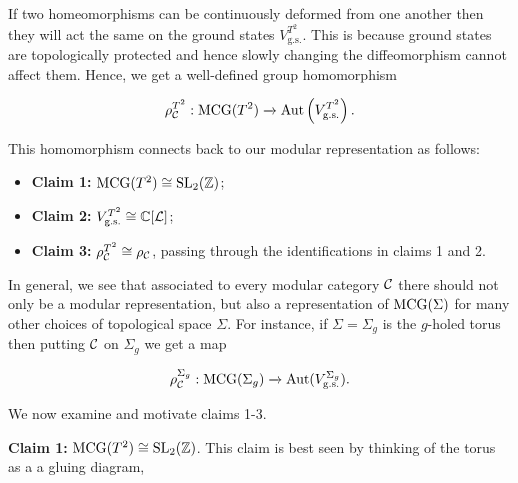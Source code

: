 If two homeomorphisms can be continuously deformed from one another then they will act the same on the ground states $V_{\text{g.s.}}^{T^2}$. This is because ground states are topologically protected and hence slowly changing the diffeomorphism cannot affect them. Hence, we get a well-defined group homomorphism

$$\rho_{{\mathcal C}}^{T^2}:\operatorname{MCG}(T^2)\xrightarrow{}\operatorname{Aut}\left(V_{\text{g.s.}}^{T^2}\right).$$

This homomorphism connects back to our modular representation as follows:

\begin{itemize}
\item \textbf{Claim 1:} $\operatorname{MCG}(T^2)\cong \operatorname{SL}_2({\mathbb Z})$;

\item \textbf{Claim 2:} $V_{\text{g.s.}}^{T^2}\cong {\mathbb C}[{\mathcal L}]$;

\item \textbf{Claim 3:} $\rho_{{\mathcal C}}^{T^2}\cong \rho_{{\mathcal C}}$, passing through the identifications in claims 1 and 2.
\end{itemize}

In general, we see that associated to every modular category ${\mathcal C}$ there should not only be a modular representation, but also a representation of $\operatorname{MCG}(\Sigma)$ for many other choices of topological space $\Sigma$. For instance, if $\Sigma=\Sigma_g$ is the $g$-holed torus then putting ${\mathcal C}$ on $\Sigma_g$ we get a map

$$\rho_{{\mathcal C}}^{\Sigma_g}:\operatorname{MCG}(\Sigma_g)\xrightarrow{}\operatorname{Aut}(V_{\text{g.s.}}^{\Sigma_g}).$$


We now examine and motivate claims 1-3.

\textbf{Claim 1:} $\operatorname{MCG}(T^2)\cong \operatorname{SL}_2({\mathbb Z})$. This claim is best seen by thinking of the torus as a a gluing diagram,





